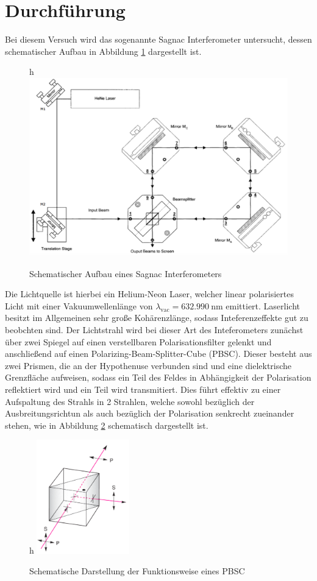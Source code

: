 \section{Durchführung}
\label{sec:Durchführung}

Bei diesem Versuch wird das sogenannte Sagnac Interferometer untersucht, dessen
schematischer Aufbau in Abbildung \ref{fig:aufbau} dargestellt ist.
\begin{figure}{h}
  \centering
  \includegraphics[width=14cm]{aufbau.png}
  \caption{Schematischer Aufbau eines Sagnac Interferometers \cite{skript}}
  \label{fig:aufbau}
\end{figure}
Die Lichtquelle ist hierbei ein Helium-Neon Laser, welcher linear polarisiertes Licht
mit einer Vakuumwellenlänge von
$\lambda_{\text{vac}}=\SI{632.990}{\nano\metre}$ emittiert.
Laserlicht besitzt im Allgemeinen sehr große Kohärenzlänge, sodass Inteferenzeffekte gut zu beobchten sind.
Der Lichtstrahl wird bei dieser Art des Inteferometers zunächst über zwei Spiegel auf einen
verstellbaren Polarisationsfilter gelenkt und anschließend auf einen Polarizing-Beam-Splitter-Cube (PBSC).
Dieser besteht aus zwei Prismen, die an der Hypothenuse verbunden sind und eine dielektrische Grenzfläche
aufweisen, sodass ein Teil des Feldes in Abhängigkeit der Polarisation reflektiert wird
und ein Teil wird transmitiert. Dies führt effektiv zu einer Aufspaltung des Strahls
in 2 Strahlen, welche sowohl bezüglich der Ausbreitungsrichtun als auch
bezüglich der Polarisation senkrecht zueinander stehen, wie in Abbildung \ref{fig:PBSC}
schematisch dargestellt ist. \\
\begin{figure}{h}
  \centering
  \includegraphics[width=4cm]{PBSC.png}
  \caption{Schematische Darstellung der Funktionsweise eines PBSC \cite{online1}}
  \label{fig:PBSC}
\end{figure}
